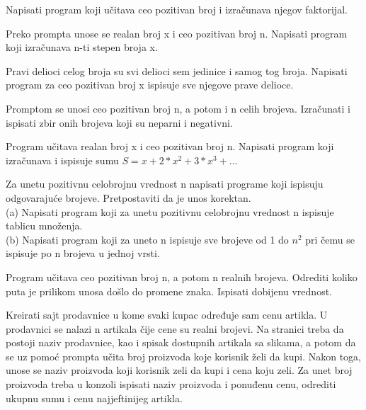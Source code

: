 \begin{primer}
Napisati program koji učitava ceo pozitivan broj i izračunava
njegov faktorijal. 
\end{primer}

\begin{primer}
Preko prompta unose se realan broj x i ceo pozitivan
broj n. Napisati program koji izračunava n-ti stepen broja x.
\end{primer}

\begin{primer}
Pravi delioci celog broja su svi delioci sem jedinice i samog
tog broja. Napisati program za ceo pozitivan broj x ispisuje sve njegove
prave delioce.
\end{primer}

\begin{primer}
Promptom se unosi ceo pozitivan broj n, a potom i n celih
brojeva. Izračunati i ispisati zbir onih brojeva koji su neparni i negativni.
\end{primer}

\begin{primer}
Program učitava realan broj x i ceo pozitivan broj n.
Napisati program koji izračunava i ispisuje sumu $S=x + 2*x^2 + 3*x^3 + ..$.
\end{primer}

\begin{primer}
Za unetu pozitivnu celobrojnu vrednost n napisati programe
koji ispisuju odgovarajuće brojeve. Pretpostaviti da je unos korektan.\\
(a) Napisati program koji za unetu pozitivnu celobrojnu vrednost n ispisuje
tablicu množenja.\\
(b) Napisati program koji za uneto n ispisuje sve brojeve od 1 do $n^2$ pri čemu se ispisuje po n brojeva u jednoj vrsti.\\
\end{primer}

\begin{primer}
Program učitava ceo pozitivan broj n, a potom n realnih
brojeva. Odrediti koliko puta je prilikom unosa došlo do promene znaka. Ispisati
dobijenu vrednost.
\end{primer}

\begin{primer}
Kreirati sajt prodavnice u kome svaki kupac određuje sam cenu artikla. U prodavnici se nalazi n artikala čije cene su realni brojevi. Na stranici treba da postoji naziv prodavnice, kao i spisak dostupnih artikala sa slikama, a potom da se uz pomoć prompta učita broj proizvoda koje korisnik želi da kupi. Nakon toga, unose se naziv proizvoda koji korisnik zeli da kupi i cena koju zeli. Za unet broj proizvoda treba u konzoli ispisati naziv proizvoda i ponuđenu cenu, odrediti ukupnu sumu i cenu najjeftinijeg artikla.
\end{primer}
\newpage


